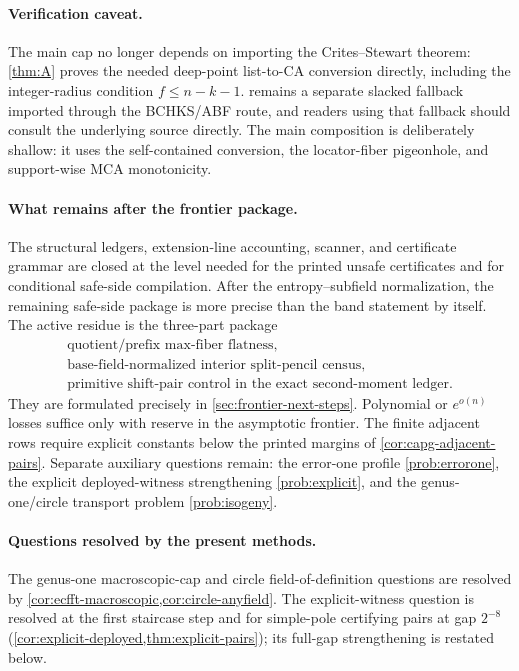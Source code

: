 \documentclass[11pt]{article}
\theoremstyle{definition}
\theoremstyle{remark}
\begin{document}
\paragraph{Verification caveat.}
The main cap no longer depends on importing the Crites--Stewart theorem: \cref{thm:A} proves the needed deep-point list-to-CA conversion directly, including the integer-radius condition $f\le n-k-1$.   remains a separate slacked fallback imported through the BCHKS/ABF route, and readers using that fallback should consult the underlying source directly.  The main composition is deliberately shallow: it uses the self-contained conversion, the locator-fiber pigeonhole, and support-wise MCA monotonicity.

\paragraph{What remains after the frontier package.}
The structural ledgers, extension-line accounting, scanner, and certificate grammar are closed at the level needed for the printed unsafe certificates and for conditional safe-side compilation.  After the entropy--subfield normalization, the remaining safe-side package is more precise than the band statement by itself.  The active residue is the three-part package
\[
\begin{gathered}
        \text{quotient/prefix max-fiber flatness},\\
        \text{base-field-normalized interior split-pencil census},\\
        \text{primitive shift-pair control in the exact second-moment ledger}.
\end{gathered}
\]
They are formulated precisely in \cref{sec:frontier-next-steps}.  Polynomial or \(e^{o(n)}\) losses suffice only with reserve in the asymptotic frontier.  The finite adjacent rows require explicit constants below the printed margins of \cref{cor:capg-adjacent-pairs}.  Separate auxiliary questions remain: the error-one profile \cref{prob:errorone}, the explicit deployed-witness strengthening \cref{prob:explicit}, and the genus-one/circle transport problem \cref{prob:isogeny}.

\paragraph{Questions resolved by the present methods.}
The genus-one macroscopic-cap and circle field-of-definition questions are resolved by \cref{cor:ecfft-macroscopic,cor:circle-anyfield}.  The explicit-witness question is resolved at the first staircase step and for simple-pole certifying pairs at gap $2^{-8}$ \textup(\cref{cor:explicit-deployed,thm:explicit-pairs}\textup); its full-gap strengthening is restated below.
\end{document}
